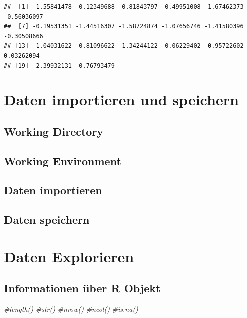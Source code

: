 \documentclass[
]{book}
\newenvironment{Shaded}{\begin{snugshade}}{\end{snugshade}}
\newcommand{\CommentTok}[1]{\textcolor[rgb]{0.56,0.35,0.01}{\textit{#1}}}
\begin{document}
\begin{verbatim}
##  [1]  1.55841478  0.12349688 -0.81843797  0.49951008 -1.67462373 -0.56036097
##  [7] -0.19531351 -1.44516307 -1.58724874 -1.07656746 -1.41580396 -0.30508666
## [13] -1.04031622  0.81096622  1.34244122 -0.06229402 -0.95722602  0.03262094
## [19]  2.39932131  0.76793479
\end{verbatim}

\hypertarget{daten-importieren-und-speichern}{%
\chapter{Daten importieren und speichern}\label{daten-importieren-und-speichern}}

\hypertarget{working-directory}{%
\section{Working Directory}\label{working-directory}}

\hypertarget{working-environment}{%
\section{Working Environment}\label{working-environment}}

\hypertarget{daten-importieren}{%
\section{Daten importieren}\label{daten-importieren}}

\hypertarget{daten-speichern}{%
\section{Daten speichern}\label{daten-speichern}}

\hypertarget{daten-explorieren}{%
\chapter{Daten Explorieren}\label{daten-explorieren}}

\hypertarget{informationen-uxfcber-r-objekt}{%
\section{Informationen über R Objekt}\label{informationen-uxfcber-r-objekt}}

\begin{Shaded}
\begin{Highlighting}[]
\CommentTok{\#length()}
\CommentTok{\#str()}
\CommentTok{\#nrow()}
\CommentTok{\#ncol()}
\CommentTok{\#is.na()}
\end{Highlighting}
\end{Shaded}
\end{document}
